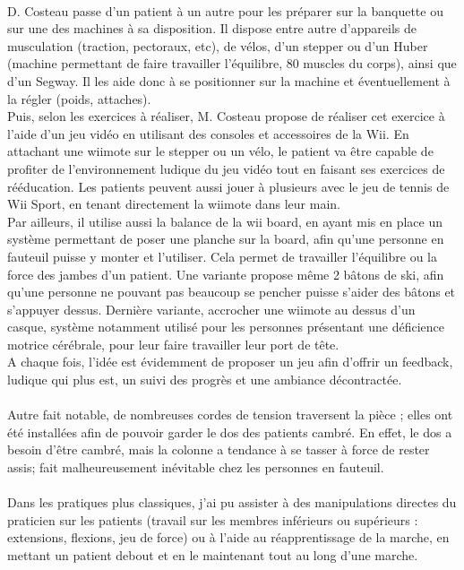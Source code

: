 \paragraph{}
D. Costeau passe d'un patient à un autre pour les préparer sur la banquette ou sur une des machines à sa disposition. Il dispose entre autre d'appareils de musculation (traction, pectoraux, etc), de vélos, d'un stepper ou d'un Huber (machine permettant de faire travailler l'équilibre, 80 muscles du corps), ainsi que d'un Segway. Il les aide donc à se positionner sur la machine et éventuellement à la régler (poids, attaches).\\
Puis, selon les exercices à réaliser, M. Costeau propose de réaliser cet exercice à l'aide d'un jeu vidéo en utilisant des consoles et accessoires de la Wii. En attachant une wiimote sur le stepper ou un vélo, le patient va être capable de profiter de l'environnement ludique du jeu vidéo tout en faisant ses exercices de rééducation. Les patients peuvent aussi jouer à plusieurs avec le jeu de tennis de Wii Sport, en tenant directement la wiimote dans leur main.\\
Par ailleurs, il utilise aussi la balance de la wii board, en ayant mis en place un système permettant de poser une planche sur la board, afin qu'une personne en fauteuil puisse y monter et l'utiliser. Cela permet de travailler l'équilibre ou la force des jambes d'un patient. Une variante propose même 2 bâtons de ski, afin qu'une personne ne pouvant pas beaucoup se pencher puisse s'aider des bâtons et s'appuyer dessus. Dernière variante, accrocher une wiimote au dessus d'un casque, système notamment utilisé pour les personnes présentant une déficience motrice cérébrale, pour leur faire travailler leur port de tête.\\
A chaque fois, l'idée est évidemment de proposer un jeu afin d'offrir un feedback, ludique qui plus est, un suivi des progrès et une ambiance décontractée.

\paragraph{}Autre fait notable, de nombreuses cordes de tension traversent la pièce ; elles ont été installées afin de pouvoir garder le dos des patients cambré. En effet, le dos a besoin d'être cambré, mais la colonne a tendance à se tasser à force de rester assis; fait malheureusement inévitable chez les personnes en fauteuil.

\paragraph{}Dans les pratiques plus classiques, j'ai pu assister à des manipulations directes du praticien sur les patients (travail sur les membres inférieurs ou supérieurs : extensions, flexions, jeu de force) ou à l'aide au réapprentissage de la marche, en mettant un patient debout et en le maintenant tout au long d'une marche.

